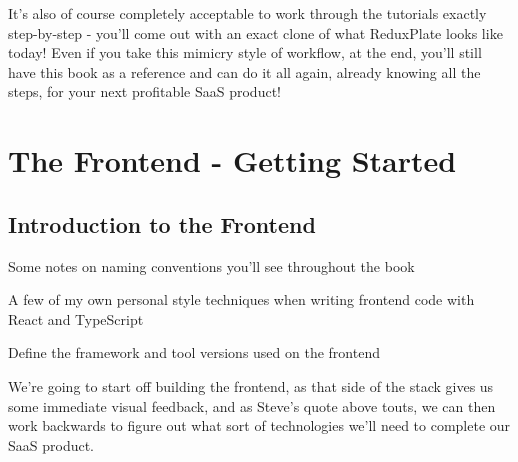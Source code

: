 \documentclass[a4paper,
                             oneside,
                             BCOR1.0cm,
                             DIV11,
                             parskip=full,
                             11pt]{scrbook}
\begin{document}
It's also of course completely acceptable to work through the tutorials exactly step-by-step - you'll come out with an exact clone of what ReduxPlate looks like today! Even if you take this mimicry style of workflow, at the end, you'll still have this book as a reference and can do it all again, already knowing all the steps, for your next profitable SaaS product!

\chapter{The Frontend - Getting Started}\label{cap:primer}

\section{Introduction to the Frontend}\label{sec:titles}
\begin{arrows}
\item Some notes on naming conventions you'll see throughout the book
\item A few of my own personal style techniques when writing frontend code with React and TypeScript
\item Define the framework and tool versions used on the frontend
\end{arrows}

We're going to start off building the frontend, as that side of the stack gives us some immediate visual feedback, and as Steve's quote above touts, we can then work backwards to figure out what sort of technologies  we'll need to complete our SaaS product. 
\end{document}
